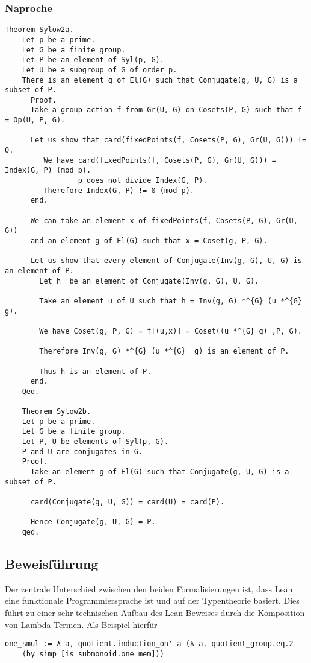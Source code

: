 \documentclass[a4paper,12pt]{scrartcl}
\begin{document}
\subsubsection{Naproche}


\begin{lstlisting}
Theorem Sylow2a.
	Let p be a prime.
	Let G be a finite group.
	Let P be an element of Syl(p, G).
	Let U be a subgroup of G of order p.
	There is an element g of El(G) such that Conjugate(g, U, G) is a subset of P.
	  Proof.
	  Take a group action f from Gr(U, G) on Cosets(P, G) such that f = Op(U, P, G).
	  
	  Let us show that card(fixedPoints(f, Cosets(P, G), Gr(U, G))) !=  0.
		 We have card(fixedPoints(f, Cosets(P, G), Gr(U, G))) = Index(G, P) (mod p).
				 p does not divide Index(G, P).
		 Therefore Index(G, P) != 0 (mod p).
	  end.
	  
	  We can take an element x of fixedPoints(f, Cosets(P, G), Gr(U, G))
	  and an element g of El(G) such that x = Coset(g, P, G).
	  
	  Let us show that every element of Conjugate(Inv(g, G), U, G) is an element of P.
		Let h  be an element of Conjugate(Inv(g, G), U, G).
	
		Take an element u of U such that h = Inv(g, G) *^{G} (u *^{G}  g).
	
		We have Coset(g, P, G) = f[(u,x)] = Coset((u *^{G} g) ,P, G).
	
		Therefore Inv(g, G) *^{G} (u *^{G}  g) is an element of P.
	
		Thus h is an element of P.
	  end.
	Qed.

	Theorem Sylow2b.
	Let p be a prime.
	Let G be a finite group.
	Let P, U be elements of Syl(p, G).
	P and U are conjugates in G.
	Proof.
	  Take an element g of El(G) such that Conjugate(g, U, G) is a subset of P.
	
	  card(Conjugate(g, U, G)) = card(U) = card(P).
	
	  Hence Conjugate(g, U, G) = P.
	qed.
\end{lstlisting}


\subsection{Beweisführung}

Der zentrale Unterschied zwischen den beiden Formalisierungen ist, dass Lean eine funktionale Programmiersprache ist und auf der Typentheorie basiert. Dies führt zu einer sehr technischen Aufbau des Lean-Beweises durch die Komposition von Lambda-Termen.
Als Beispiel hierfür 
\lstset{language=lean}
\begin{lstlisting}
one_smul := λ a, quotient.induction_on' a (λ a, quotient_group.eq.2
    (by simp [is_submonoid.one_mem]))
\end{lstlisting}
\end{document}
